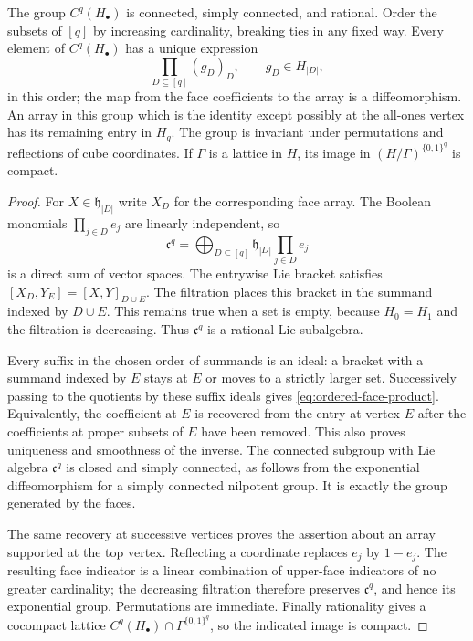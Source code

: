 \begin{lemma}\label{lem:upper-face-coordinates}
The group $C^q(H_\bullet)$ is connected, simply connected, and rational.
Order the subsets of $[q]$ by increasing cardinality, breaking ties in any
fixed way.  Every element of $C^q(H_\bullet)$ has a unique expression
\begin{equation}
 \prod_{D\subseteq[q]}(g_D)_D,\qquad g_D\in H_{|D|},
 \label{eq:ordered-face-product}
\end{equation}
in this order; the map from the face coefficients to the array is a
diffeomorphism.  An array in this group which is the identity except possibly
at the all-ones vertex has its remaining entry in $H_q$.
The group is invariant under permutations and reflections of cube
coordinates.  If $\Gamma$ is a lattice in $H$, its image in
$(H/\Gamma)^{\{0,1\}^q}$ is compact.
\end{lemma}

\begin{proof}
For $X\in\mathfrak h_{|D|}$ write $X_D$ for the corresponding face array.
The Boolean monomials $\prod_{j\in D}e_j$ are linearly independent, so
\[
 \mathfrak c^q
 =\bigoplus_{D\subseteq[q]}
   \mathfrak h_{|D|}\prod_{j\in D}e_j
\]
is a direct sum of vector spaces.  The entrywise Lie bracket satisfies
$[X_D,Y_E]=[X,Y]_{D\cup E}$.  The filtration places this bracket in
the summand indexed by $D\cup E$.  This remains true when a set is empty,
because $H_0=H_1$ and the filtration is decreasing.  Thus
$\mathfrak c^q$ is a rational Lie subalgebra.

Every suffix in the chosen order of summands is an ideal: a bracket with a
summand indexed by $E$ stays at $E$ or moves to a strictly larger set.
Successively passing to the quotients by these suffix ideals gives
\eqref{eq:ordered-face-product}.  Equivalently, the coefficient at $E$ is
recovered from the entry at vertex $E$ after the coefficients at proper
subsets of $E$ have been removed.  This also proves uniqueness and smoothness
of the inverse.  The connected subgroup with Lie algebra $\mathfrak c^q$
is closed and simply connected, as follows from the exponential
diffeomorphism for a simply connected nilpotent group.  It is exactly the
group generated by the faces.

The same recovery at successive vertices proves the assertion about an array
supported at the top vertex.  Reflecting a coordinate replaces $e_j$ by
$1-e_j$.  The resulting face indicator is a linear combination of upper-face
indicators of no greater cardinality; the decreasing filtration therefore
preserves $\mathfrak c^q$, and hence its exponential group.  Permutations are
immediate.  Finally rationality gives a cocompact lattice
$C^q(H_\bullet)\cap\Gamma^{\{0,1\}^q}$, so the indicated image is compact.
\end{proof}

